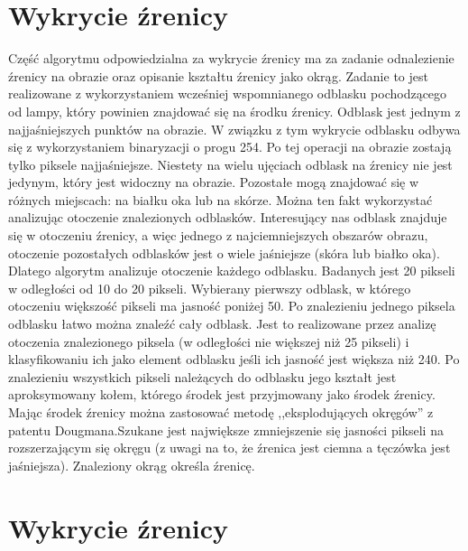 \section{Wykrycie źrenicy}
\label{sec:wykrycieZrenicy}
Część algorytmu odpowiedzialna za wykrycie źrenicy ma za zadanie odnalezienie źrenicy na obrazie oraz opisanie kształtu źrenicy jako okrąg. Zadanie to jest realizowane z wykorzystaniem wcześniej wspomnianego odblasku pochodzącego od lampy, który powinien znajdować się na środku źrenicy. Odblask jest jednym z najjaśniejszych punktów na obrazie. W związku z tym wykrycie odblasku odbywa się z wykorzystaniem binaryzacji o progu 254. Po tej operacji na obrazie zostają tylko piksele najjaśniejsze. Niestety na wielu ujęciach odblask na źrenicy nie jest jedynym, który jest widoczny na obrazie. Pozostałe mogą znajdować się w różnych miejscach: na białku oka lub na skórze. Można ten fakt wykorzystać analizując otoczenie znalezionych odblasków. Interesujący nas odblask znajduje się w otoczeniu źrenicy, a więc jednego z najciemniejszych obszarów obrazu, otoczenie pozostałych odblasków jest o wiele jaśniejsze (skóra lub białko oka). Dlatego algorytm analizuje otoczenie każdego odblasku. Badanych jest 20 pikseli w odległości od 10 do 20 pikseli. Wybierany pierwszy odblask, w którego otoczeniu większość pikseli ma jasność poniżej 50. Po znalezieniu jednego piksela odblasku łatwo można znaleźć cały odblask. Jest to realizowane przez analizę otoczenia znalezionego piksela (w odległości nie większej niż 25 pikseli) i klasyfikowaniu ich jako element odblasku jeśli ich jasność jest większa niż 240. Po znalezieniu wszystkich pikseli należących do odblasku jego kształt jest aproksymowany kołem, którego środek jest przyjmowany jako środek źrenicy. Mając środek źrenicy można zastosować metodę ,,eksplodujących okręgów'' z patentu Dougmana.Szukane jest największe zmniejszenie się jasności pikseli na rozszerzającym się okręgu (z uwagi na to, że źrenica jest ciemna a tęczówka jest jaśniejsza). Znaleziony okrąg określa źrenicę.

\section{Wykrycie źrenicy}
\label{sec:wykrycieZrenicy}
